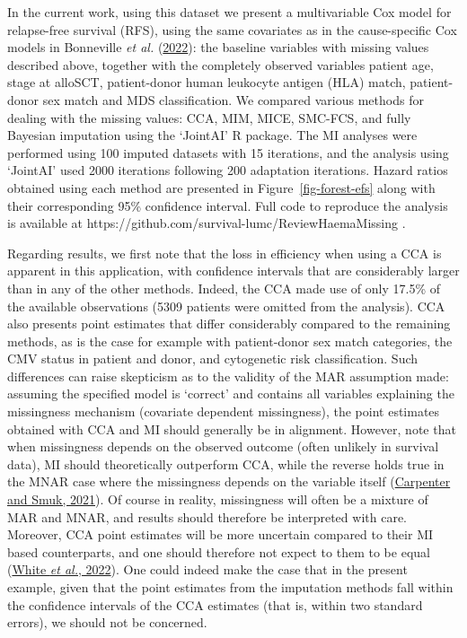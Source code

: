 \documentclass[
  letterpaper,
  DIV=11,
  numbers=noendperiod]{scrreprt}
\begin{document}
In the current work, using this dataset we present a multivariable Cox
model for relapse-free survival (RFS), using the same covariates as in
the cause-specific Cox models in Bonneville \emph{et al.}
(\protect\hyperlink{ref-bonnevilleMultipleImputationCausespecific2022}{2022}):
the baseline variables with missing values described above, together
with the completely observed variables patient age, stage at alloSCT,
patient-donor human leukocyte antigen (HLA) match, patient-donor sex
match and MDS classification. We compared various methods for dealing
with the missing values: CCA, MIM, MICE, SMC-FCS, and fully Bayesian
imputation using the `JointAI' R package. The MI analyses were performed
using 100 imputed datasets with 15 iterations, and the analysis using
`JointAI' used 2000 iterations following 200 adaptation iterations.
Hazard ratios obtained using each method are presented in
Figure~\ref{fig-forest-efs} along with their corresponding 95\%
confidence interval. Full code to reproduce the analysis is available at
https://github.com/survival-lumc/ReviewHaemaMissing .

Regarding results, we first note that the loss in efficiency when using
a CCA is apparent in this application, with confidence intervals that
are considerably larger than in any of the other methods. Indeed, the
CCA made use of only 17.5\% of the available observations (5309 patients
were omitted from the analysis). CCA also presents point estimates that
differ considerably compared to the remaining methods, as is the case
for example with patient-donor sex match categories, the CMV status in
patient and donor, and cytogenetic risk classification. Such differences
can raise skepticism as to the validity of the MAR assumption made:
assuming the specified model is `correct' and contains all variables
explaining the missingness mechanism (covariate dependent missingness),
the point estimates obtained with CCA and MI should generally be in
alignment. However, note that when missingness depends on the observed
outcome (often unlikely in survival data), MI should theoretically
outperform CCA, while the reverse holds true in the MNAR case where the
missingness depends on the variable itself
(\protect\hyperlink{ref-carpenterMissingDataStatistical2021}{Carpenter
and Smuk, 2021}). Of course in reality, missingness will often be a
mixture of MAR and MNAR, and results should therefore be interpreted
with care. Moreover, CCA point estimates will be more uncertain compared
to their MI based counterparts, and one should therefore not expect to
them to be equal (\protect\hyperlink{ref-whiteMissingDataPart2022}{White
\emph{et al.}, 2022}). One could indeed make the case that in the
present example, given that the point estimates from the imputation
methods fall within the confidence intervals of the CCA estimates (that
is, within two standard errors), we should not be concerned.
\end{document}

